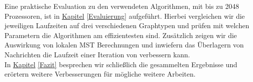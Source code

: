 Eine praktische Evaluation zu den verwendeten Algorithmen, mit bis zu 2048 Prozessoren, ist in \hyperref[Evaluierung]{Kapitel} \ref{Evaluierung} aufgeführt.
Hierbei vergleichen wir die jeweiligen Laufzeiten auf drei verschiedenen Graphtypen und prüfen mit welchen Parametern die Algorithmen am effizientesten sind. Zusätzlich zeigen wir die Auswirkung von lokalen MST Berechnungen und inwiefern das Überlagern von Nachrichten die Laufzeit einer Iteration von \boruvkaAllreduce verbessern kann. \\
In \hyperref[Fazit]{Kapitel} \ref{Fazit} besprechen wir schließlich die gesammelten Ergebnisse und erörtern weitere Verbesserungen für mögliche weitere Arbeiten.




